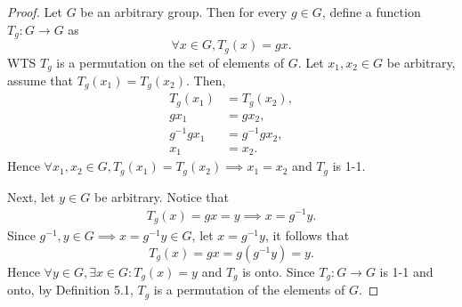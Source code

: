 \documentclass{article}
\theoremstyle{definition}
\begin{document}
 \begin{proof}
     Let $G$ be an arbitrary group. Then for every $g \in G$, define a function $T_g:G \to G$ as
     \begin{equation*}
         \forall x \in G, T_g(x) = gx.
     \end{equation*}
     WTS $T_g$ is a permutation on the set of elements of $G$. Let $x_1,x_2 \in G$ be arbitrary, assume that $T_g(x_1) = T_g(x_2)$. Then,
     \begin{align*}
         T_g(x_1) &= T_g(x_2), \\
         gx_1 &= gx_2, \\
         g^{-1}gx_1 &= g^{-1}gx_2, \\
         x_1 &= x_2.
     \end{align*}
     Hence $\forall x_1, x_2 \in G, T_g(x_1) = T_g(x_2) \implies x_1=x_2$ and $T_g$ is 1-1. 
     
     Next, let $y \in G$ be arbitrary. Notice that
     \begin{align*}
         T_g(x) = gx = y \implies x = g^{-1}y.
     \end{align*}
     Since $g^{-1}, y \in G \implies x = g^{-1}y \in G$, let $x = g^{-1}y$, it follows that
     \begin{equation*}
         T_g(x) = gx = g(g^{-1}y) = y.
     \end{equation*}
     Hence $\forall y \in G, \exists x \in G: T_g(x)=y$ and $T_g$ is onto. Since $T_g:G \to G$ is 1-1 and onto, by Definition 5.1, $T_g$ is a permutation of the elements of $G$.
     

\end{proof}
\end{document}
